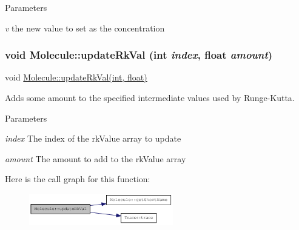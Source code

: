 \begin{DoxyParams}{Parameters}
\item[{\em v}]the new value to set as the concentration \end{DoxyParams}
\hypertarget{classMolecule_ab1dd1cb050ddb53a5ce4d9635e3ae03b}{
\subsubsection[{updateRkVal}]{\setlength{\rightskip}{0pt plus 5cm}void Molecule::updateRkVal (int {\em index}, \/  float {\em amount})}}
\label{classMolecule_ab1dd1cb050ddb53a5ce4d9635e3ae03b}
void \hyperlink{classMolecule_ab1dd1cb050ddb53a5ce4d9635e3ae03b}{Molecule::updateRkVal(int, float)}

Adds some amount to the specified intermediate values used by Runge-\/Kutta.


\begin{DoxyParams}{Parameters}
\item[{\em index}]The index of the rkValue array to update \item[{\em amount}]The amount to add to the rkValue array \end{DoxyParams}


Here is the call graph for this function:\nopagebreak
\begin{figure}[H]
\begin{center}
\leavevmode
\includegraphics[width=178pt]{classMolecule_ab1dd1cb050ddb53a5ce4d9635e3ae03b_cgraph}
\end{center}
\end{figure}


